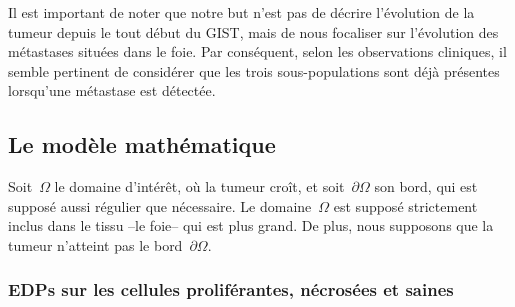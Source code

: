 \documentclass[main.tex]{subfiles}
\begin{document}
Il est important de noter que notre but n'est pas de décrire l'évolution de la tumeur depuis le tout début du GIST, mais de nous focaliser sur l'évolution des métastases situées dans le foie. 
Par conséquent, selon les observations cliniques, il semble pertinent de considérer que les trois sous-populations sont déjà présentes lorsqu'une métastase est détectée.

\subsection{Le modèle mathématique}

Soit~$\Omega$ le domaine d'intérêt, où la tumeur croît, et soit~$\partial\Omega$ son bord, qui est supposé aussi régulier que nécessaire. Le domaine~$\Omega$ est supposé strictement inclus dans le tissu --le foie-- qui est plus grand. De plus, nous supposons que la tumeur n'atteint pas le bord~$\partial\Omega$.

\subsubsection{EDPs sur les cellules proliférantes, nécrosées et saines}
\end{document}
